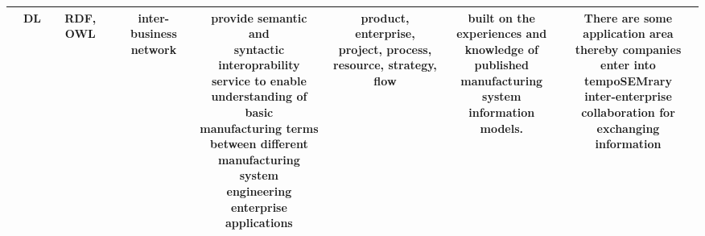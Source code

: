 \begin{landscape}
\begin{table}[ht!]
\begin{center}
\begin{adjustwidth}{}{}
\begin{tabular}{ c | c | c | c | c | c | c | c  }
					\tiny \textit{\makecell{MSE ontology\cite{Lin}}} & \tiny DL & \tiny RDF, OWL & \tiny \makecell[l]{inter-business\\ network} & \tiny \makecell[l]{provide semantic and\\ syntactic interoprability\\ service to enable\\ understanding of basic\\ manufacturing terms \\between different \\manufacturing system\\ engineering enterprise \\applications} & \tiny \makecell[l]{product, enterprise,\\ project, process,\\ resource, strategy, flow} & \tiny \makecell[l]{built on the\\ experiences and\\ knowledge of \\published\\ manufacturing\\ system information\\ models.}        
					& \tiny \makecell[l]{There are some \\application area\\ thereby companies\\ enter into tempoSEMrary\\ inter-enterprise\\ collaboration for\\ exchanging information} \\
					
					\hline
					

\end{tabular}
\end{adjustwidth}
\end{center}
\end{table}
\end{landscape}
